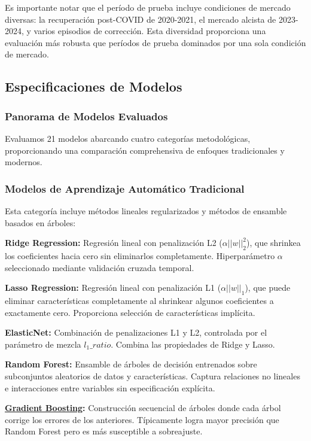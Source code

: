 \documentclass[11pt,a4paper]{article}
\newcommand{\gterm}[2]{\hyperref[glos:#1]{#2}}
\begin{document}
Es importante notar que el período de prueba incluye condiciones de mercado diversas: la recuperación post-COVID de 2020-2021, el mercado alcista de 2023-2024, y varios episodios de corrección. Esta diversidad proporciona una evaluación más robusta que períodos de prueba dominados por una sola condición de mercado.

\subsection{Especificaciones de Modelos}

\subsubsection{Panorama de Modelos Evaluados}

Evaluamos 21 modelos abarcando cuatro categorías metodológicas, proporcionando una comparación comprehensiva de enfoques tradicionales y modernos.

\subsubsection{Modelos de Aprendizaje Automático Tradicional}

Esta categoría incluye métodos lineales regularizados y métodos de ensamble basados en árboles:

\textbf{Ridge Regression:} Regresión lineal con penalización L2 ($\alpha ||w||_2^2$), que shrinkea los coeficientes hacia cero sin eliminarlos completamente. Hiperparámetro $\alpha$ seleccionado mediante validación cruzada temporal.

\textbf{Lasso Regression:} Regresión lineal con penalización L1 ($\alpha ||w||_1$), que puede eliminar características completamente al shrinkear algunos coeficientes a exactamente cero. Proporciona selección de características implícita.

\textbf{ElasticNet:} Combinación de penalizaciones L1 y L2, controlada por el parámetro de mezcla $l_1\_ratio$. Combina las propiedades de Ridge y Lasso.

\textbf{Random Forest:} Ensamble de árboles de decisión entrenados sobre subconjuntos aleatorios de datos y características. Captura relaciones no lineales e interacciones entre variables sin especificación explícita.

\textbf{\gterm{gradient-boosting}{Gradient Boosting}:} Construcción secuencial de árboles donde cada árbol corrige los errores de los anteriores. Típicamente logra mayor precisión que Random Forest pero es más susceptible a sobreajuste.
\end{document}
